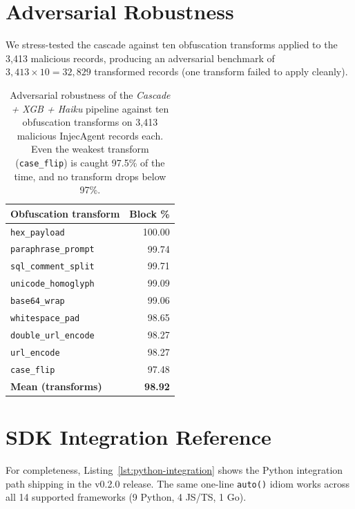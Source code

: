\section{Adversarial Robustness}
\label{app:obfuscation}

We stress-tested the cascade against ten obfuscation transforms
applied to the 3{,}413 malicious records, producing an adversarial
benchmark of $3{,}413 \times 10 = 32{,}829$ transformed records
(one transform failed to apply cleanly).

\begin{table}[h]
\centering\small
\begin{tabular}{lr}
\toprule
\textbf{Obfuscation transform} & \textbf{Block \%} \\
\midrule
\texttt{hex\_payload}       & 100.00 \\
\texttt{paraphrase\_prompt} &  99.74 \\
\texttt{sql\_comment\_split}&  99.71 \\
\texttt{unicode\_homoglyph} &  99.09 \\
\texttt{base64\_wrap}       &  99.06 \\
\texttt{whitespace\_pad}    &  98.65 \\
\texttt{double\_url\_encode}&  98.27 \\
\texttt{url\_encode}        &  98.27 \\
\texttt{case\_flip}         &  97.48 \\
\midrule
\textbf{Mean (transforms)}  & \textbf{98.92} \\
\bottomrule
\end{tabular}
\caption{Adversarial robustness of the \emph{Cascade + XGB + Haiku}
pipeline against ten obfuscation transforms on 3{,}413 malicious
InjecAgent records each. Even the weakest transform
(\texttt{case\_flip}) is caught 97.5\% of the time, and no
transform drops below 97\%.}
\label{tab:obfuscation}
\end{table}

\section{SDK Integration Reference}
\label{app:sdk}

For completeness, Listing~\ref{lst:python-integration} shows the
Python integration path shipping in the v0.2.0 release. The
same one-line \texttt{auto()} idiom works across all 14
supported frameworks (9 Python, 4 JS/TS, 1 Go).

